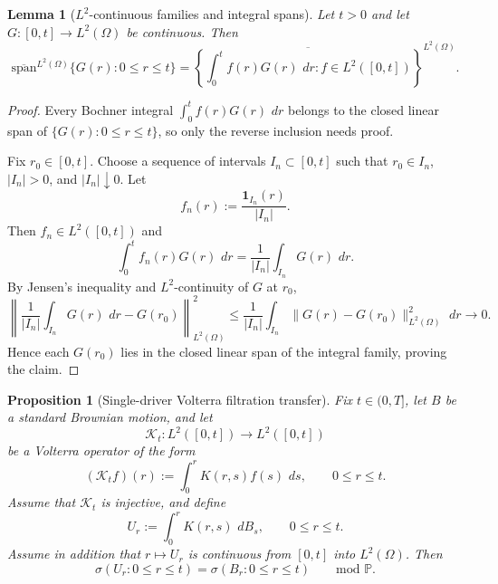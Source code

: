 \documentclass[11pt,a4paper]{amsart}
\theoremstyle{plain}
\newtheorem{proposition}[theorem]{Proposition}
\newtheorem{lemma}[theorem]{Lemma}
\theoremstyle{definition}
\theoremstyle{remark}
\newcommand{\PP}{\mathbb{P}}
\newcommand{\dd}{\,d}
\newcommand{\one}{\mathbf 1}
\begin{document}
\begin{lemma}[$L^2$-continuous families and integral spans]\label{lem:integral-span}
Let $t>0$ and let $G:[0,t]\to L^2(\Omega)$ be continuous. Then
\[
\overline{\mathrm{span}}^{L^2(\Omega)}\{G(r):0\le r\le t\}
=
\overline{\left\{
\int_0^t f(r)G(r)\,\dd r : f\in L^2([0,t])
\right\}}^{L^2(\Omega)}.
\]
\end{lemma}

\begin{proof}
Every Bochner integral $\int_0^t f(r)G(r)\,\dd r$ belongs to the closed linear span of
$\{G(r):0\le r\le t\}$, so only the reverse inclusion needs proof.

Fix $r_0\in[0,t]$. Choose a sequence of intervals $I_n\subset[0,t]$ such that
$r_0\in I_n$, $|I_n|>0$, and $|I_n|\downarrow0$. Let
\[
f_n(r):=\frac{\one_{I_n}(r)}{|I_n|}.
\]
Then $f_n\in L^2([0,t])$ and
\[
\int_0^t f_n(r)G(r)\,\dd r
=
\frac{1}{|I_n|}\int_{I_n} G(r)\,\dd r.
\]
By Jensen's inequality and $L^2$-continuity of $G$ at $r_0$,
\[
\left\|
\frac{1}{|I_n|}\int_{I_n} G(r)\,\dd r-G(r_0)
\right\|_{L^2(\Omega)}^2
\le
\frac{1}{|I_n|}\int_{I_n}\|G(r)-G(r_0)\|_{L^2(\Omega)}^2\,\dd r
\longrightarrow 0.
\]
Hence each $G(r_0)$ lies in the closed linear span of the integral family, proving the
claim.
\end{proof}

\begin{proposition}[Single-driver Volterra filtration transfer]
\label{prop:filtration-transfer}
Fix $t\in(0,T]$, let $B$ be a standard Brownian motion, and let
\[
\mathcal K_t:L^2([0,t])\to L^2([0,t])
\]
be a Volterra operator of the form
\[
(\mathcal K_tf)(r):=\int_0^r K(r,s)f(s)\,\dd s,
\qquad 0\le r\le t.
\]
Assume that $\mathcal K_t$ is injective, and define
\[
U_r:=\int_0^r K(r,s)\,\dd B_s,
\qquad 0\le r\le t.
\]
Assume in addition that $r\mapsto U_r$ is continuous from $[0,t]$ into $L^2(\Omega)$.
Then
\begin{equation}\label{eq:filtration-transfer}
\sigma(U_r:0\le r\le t)
=
\sigma(B_r:0\le r\le t)
\qquad\text{mod }\PP.
\end{equation}
\end{proposition}
\end{document}
